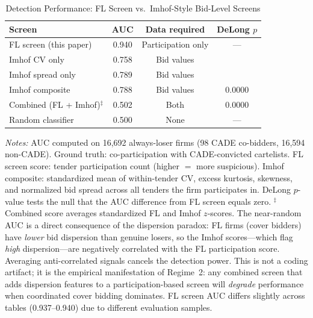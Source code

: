 \begin{table}[htbp]
\centering
\caption{Detection Performance: FL Screen vs.\ Imhof-Style Bid-Level Screens}
\label{tab:imhof_comparison}
\begin{threeparttable}
\small
\begin{tabular}{lccc}
\toprule
Screen & AUC & Data required & DeLong $p$ \\
\midrule
FL screen (this paper) & 0.940 & Participation only & --- \\
Imhof CV only & 0.758 & Bid values & \\
Imhof spread only & 0.789 & Bid values & \\
Imhof composite & 0.788 & Bid values & 0.0000 \\
Combined (FL + Imhof)$^{\ddagger}$ & 0.502 & Both & 0.0000 \\
Random classifier & 0.500 & None & --- \\
\bottomrule
\end{tabular}
\begin{tablenotes}
\small
\item \textit{Notes:} AUC computed on 16,692 always-loser firms
(98 CADE co-bidders, 16,594 non-CADE).
Ground truth: co-participation with CADE-convicted cartelists.
FL screen score: tender participation count (higher $=$ more suspicious).
Imhof composite: standardized mean of within-tender CV, excess kurtosis,
skewness, and normalized bid spread across all tenders the firm participates in.
DeLong $p$-value tests the null that the AUC difference from FL screen equals zero.
$^{\ddagger}$Combined score averages standardized FL and Imhof
$z$-scores. The near-random AUC is a direct consequence of the
dispersion paradox: FL firms (cover bidders) have \emph{lower}
bid dispersion than genuine losers, so the Imhof scores---which
flag \emph{high} dispersion---are negatively correlated with the
FL participation score. Averaging anti-correlated signals cancels
the detection power. This is not a coding artifact; it is the
empirical manifestation of Regime~2: any combined screen that
adds dispersion features to a participation-based screen will
\emph{degrade} performance when coordinated cover bidding
dominates. FL screen AUC differs slightly across tables
(0.937--0.940) due to different evaluation samples.
\end{tablenotes}
\end{threeparttable}
\end{table}
